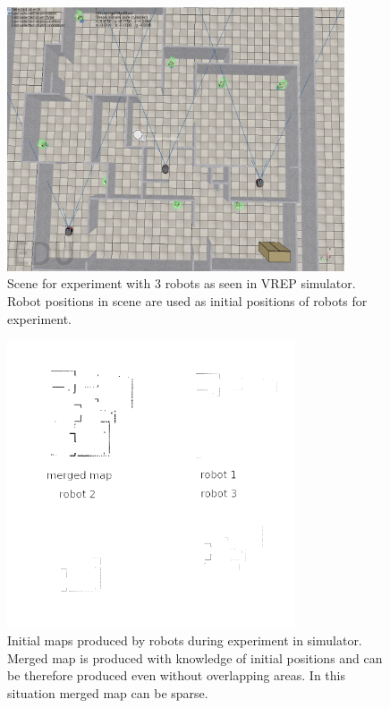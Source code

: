 \begin{figure}
    \centering
    \includegraphics[width=3.93in]{../img/minimal-overlapping-area-scene.png}
    \caption{Scene for experiment with $3$ robots as seen in \gls{VREP} simulator. Robot positions in scene are used as initial positions of robots for experiment.}
    \label{fig:minimal-overlapping-area-scene}
\end{figure}

\begin{figure}
    \centering
    \includegraphics[width=3.35in]{../img/merging-with-known-initial-positions-begin.png}
    \caption{Initial maps produced by robots during experiment in simulator. Merged map is produced with knowledge of initial positions and can be therefore produced even without overlapping areas. In this situation merged map can be sparse.}
    \label{fig:merging-with-known-initial-positions-begin}
\end{figure}

